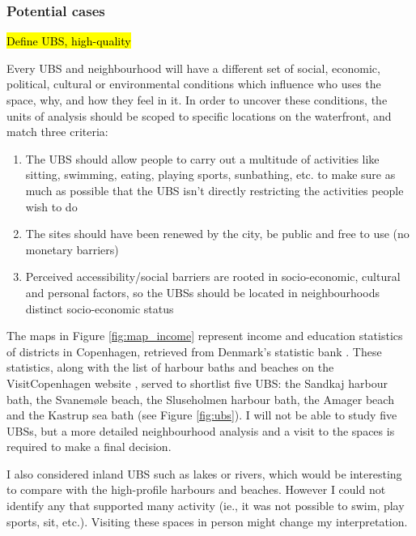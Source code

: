 \documentclass{article}
\begin{document}

\subsubsection{Potential cases}

\hl{Define UBS, high-quality}

Every UBS and neighbourhood will have a different set of social, economic, political, cultural or environmental conditions which influence who uses the space, why, and how they feel in it. In order to uncover these conditions, the units of analysis should be scoped to specific locations on the waterfront, and match three criteria:

\begin{enumerate}
	\item The UBS should allow people to carry out a multitude of activities like sitting, swimming, eating, playing sports, sunbathing, etc. to make sure as much as possible that the UBS isn't directly restricting the activities people wish to do
	\item The sites should have been renewed by the city, be public and free to use (no monetary barriers)
	\item Perceived accessibility/social barriers are rooted in socio-economic, cultural and personal factors, so the UBSs should be located in neighbourhoods distinct socio-economic status
\end{enumerate}

The maps in Figure \ref{fig:map_income} represent income and education statistics of districts in Copenhagen, retrieved from Denmark's statistic bank \parencite{copenhagenStatbank}. These statistics, along with the list of harbour baths and beaches on the VisitCopenhagen website \parencite{visitcopenhagen_baths}, served to shortlist five UBS: the Sandkaj harbour bath, the Svanemøle beach, the Sluseholmen harbour bath, the Amager beach and the Kastrup sea bath (see Figure \ref{fig:ubs}). I will not be able to study five UBSs, but a more detailed neighbourhood analysis and a visit to the spaces is required to make a final decision. 

I also considered inland UBS such as lakes or rivers, which would be interesting to compare with the high-profile harbours and beaches. However I could not identify any that supported many activity (ie., it was not possible to swim, play sports, sit, etc.). Visiting these spaces in person might change my interpretation.
\end{document}
